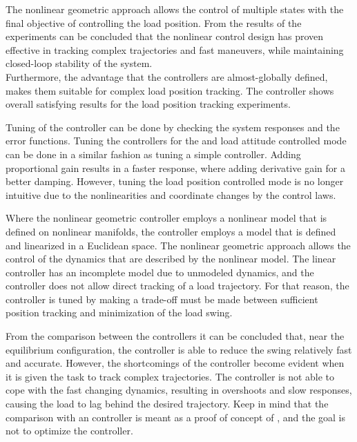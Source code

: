 The nonlinear geometric approach allows the control of multiple states with the final objective of controlling the load position.
From the results of the experiments can be concluded that the nonlinear control design has proven effective in tracking complex trajectories and fast maneuvers,
while maintaining closed-loop stability of the system. \\
Furthermore, the advantage that the controllers are almost-globally defined, makes them suitable for complex load position tracking.
The controller shows overall satisfying results for the load position tracking experiments. 

Tuning of the controller can be done by checking the system responses and the error functions.
Tuning the controllers for the  and load attitude controlled mode can be done in a similar fashion as tuning a simple  controller. 
Adding proportional gain results in a faster response, where adding derivative gain for a better damping. 
However, tuning the load position controlled mode is no longer intuitive due to the nonlinearities and coordinate changes by the control laws.

Where the nonlinear geometric controller employs a nonlinear model that is defined on nonlinear manifolds,
the  controller employs a model that is defined and linearized in a Euclidean space. 
The nonlinear geometric approach allows the control of the dynamics that are described by the nonlinear model.
The linear controller has an incomplete model due to unmodeled dynamics, and the controller does not allow direct tracking of a load trajectory.
For that reason, the  controller is tuned by making a trade-off must be made between sufficient  position tracking and minimization of the load swing. 

From the comparison between the controllers it can be concluded that, 
near the equilibrium configuration, the  controller is able to reduce the swing relatively fast and accurate.
However, the shortcomings of the  controller become evident when it is given the task to track complex trajectories. 
The controller is not able to cope with the fast changing dynamics, resulting in overshoots and slow responses, causing the load to lag behind the desired trajectory.
Keep in mind that the comparison with an  controller is meant as a proof of concept of , and the goal is not to optimize the  controller. 


